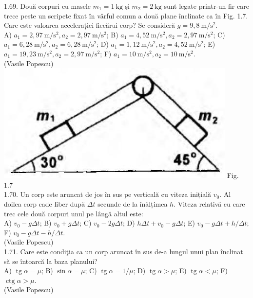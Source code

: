 \documentclass[10pt]{article}
\begin{document}
1.69. Două corpuri cu masele $m_{1}=1 \mathrm{~kg}$ şi $m_{2}=2 \mathrm{~kg}$ sunt legate printr-un fir care trece peste un scripete fixat în vârful comun a două plane înclinate ca în Fig. 1.7. Care este valoarea accelerației fiecărui corp? Se consideră $g=9,8 \mathrm{~m} / \mathrm{s}^{2}$.\\ A) $a_{1}=2,97 \mathrm{~m} / \mathrm{s}^{2}, a_{2}=2,97 \mathrm{~m} / \mathrm{s}^{2}$; B) $a_{1}=4,52 \mathrm{~m} / \mathrm{s}^{2}, a_{2}=2,97 \mathrm{~m} / \mathrm{s}^{2}$; C) $a_{1}=6,28 \mathrm{~m} / \mathrm{s}^{2}, a_{2}=6,28 \mathrm{~m} / \mathrm{s}^{2}$; D) $a_{1}=1,12 \mathrm{~m} / \mathrm{s}^{2}, a_{2}=4,52 \mathrm{~m} / \mathrm{s}^{2}$; E) $a_{1}=19,23 \mathrm{~m} / \mathrm{s}^{2}, a_{2}=2,97 \mathrm{~m} / \mathrm{s}^{2}$; F) $a_{1}=10 \mathrm{~m} / \mathrm{s}^{2}, a_{2}=10 \mathrm{~m} / \mathrm{s}^{2}$.\\ (Vasile Popescu)\\ \includegraphics[max width=\textwidth, center]{2025_07_01_5b3ff9fa0d508c8e9f17g-018} Fig. 1.7\\

1.70. Un corp este aruncat de jos în sus pe verticală cu viteza inițială $v_{0}$. Al doilea corp cade liber după $\Delta t$ secunde de la înălțimea $h$. Viteza relativă cu care trec cele două corpuri unul pe lângă altul este:\\ A) $v_{0}-g \Delta t$; B) $v_{0}+g \Delta t$; C) $v_{0}-2 g \Delta t$; D) $h \Delta t+v_{0}-g \Delta t$; E) $v_{0}-g \Delta t+h / \Delta t$; F) $v_{0}-g \Delta t-h / \Delta t$.\\ (Vasile Popescu)\\

1.71. Care este condiţia ca un corp aruncat în sus de-a lungul unui plan înclinat să se întoarcă la baza planului?\\ A) $\operatorname{tg} \alpha=\mu$; B) $\sin \alpha=\mu$; C) $\operatorname{tg} \alpha=1 / \mu$; D) $\operatorname{tg} \alpha>\mu$; E) $\operatorname{tg} \alpha<\mu$; F) $\operatorname{ctg} \alpha>\mu$.\\ (Vasile Popescu)\\
\end{document}
